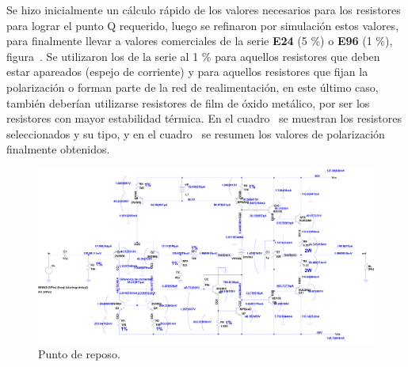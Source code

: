 
Se hizo inicialmente un cálculo rápido de los valores necesarios para los resistores para lograr el punto Q requerido, luego se refinaron por simulación estos valores, para finalmente llevar a valores comerciales de la serie \textbf{E24} (5 \%) o \textbf{E96} (1 \%), figura~. Se utilizaron los de la serie al 1 \% para aquellos resistores que deben estar apareados (espejo de corriente) y para aquellos resistores que fijan la polarización o forman parte de la red de realimentación, en este último caso, también deberían utilizarse resistores de film de óxido metálico, por ser los resistores con mayor estabilidad térmica. En el cuadro~ se muestran los resistores seleccionados y su tipo, y en el cuadro~ se resumen los valores de polarización finalmente obtenidos.


\begin{figure}[H] %
\begin{center}
\includegraphics[width=1.1 \textwidth, angle=0]{./img/qpoint/amplifier_qpoint.png}
\caption{\label{fig:fig_q_point}\footnotesize{Punto de reposo.}}
\end{center}
\end{figure}

\clearpage



 
